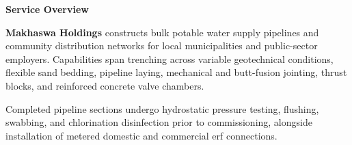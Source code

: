 \documentclass[a4paper,11pt]{article}
\begin{document}
\noindent
\begin{minipage}[t]{0.63\textwidth}
    \vspace{0pt}
    {\large\bfseries\color{mhnavy} Service Overview}
    \vspace{0.08cm}

    {\fontsize{8.7pt}{12.3pt}\selectfont\color{mhtext}
    \textbf{Makhaswa Holdings} constructs bulk potable water supply pipelines and community distribution networks for local municipalities and public-sector employers. Capabilities span trenching across variable geotechnical conditions, flexible sand bedding, pipeline laying, mechanical and butt-fusion jointing, thrust blocks, and reinforced concrete valve chambers.
    }

    \vspace{0.15cm}

    {\fontsize{8.7pt}{12.3pt}\selectfont\color{mhtext}
    Completed pipeline sections undergo hydrostatic pressure testing, flushing, swabbing, and chlorination disinfection prior to commissioning, alongside installation of metered domestic and commercial erf connections.
    }
\end{minipage}
\hfill
\end{document}
